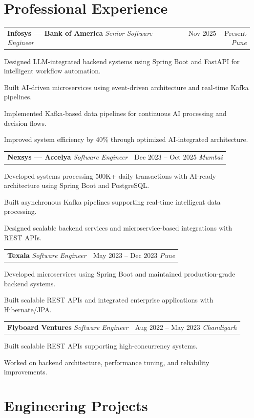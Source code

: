 \documentclass[10pt, letterpaper]{article}
\makeatletter
\newcommand{\resumeitem}[1]{\item\small{#1}}
\newcommand{\jobheading}[4]{%
  \noindent
  \begin{tabularx}{\textwidth}{@{}X r@{}}
    \textbf{\color{primary}#1} \textbar{} \textit{\small\color{subtle}#2} &
    \small\color{subtle}#3 \textbar{} \textit{\small #4}
  \end{tabularx}%
}
\makeatother
\begin{document}
\section{Professional Experience}

\jobheading{Infosys --- Bank of America}{Senior Software Engineer}{Nov 2025 -- Present}{Pune}

\begin{jobitems}
\resumeitem{Designed LLM-integrated backend systems using Spring Boot and FastAPI for intelligent workflow automation.}
\resumeitem{Built AI-driven microservices using event-driven architecture and real-time Kafka pipelines.}
\resumeitem{Implemented Kafka-based data pipelines for continuous AI processing and decision flows.}
\resumeitem{Improved system efficiency by 40\% through optimized AI-integrated architecture.}
\end{jobitems}

\jobheading{Nexsys --- Accelya}{Software Engineer}{Dec 2023 -- Oct 2025}{Mumbai}

\begin{jobitems}
\resumeitem{Developed systems processing 500K+ daily transactions with AI-ready architecture using Spring Boot and PostgreSQL.}
\resumeitem{Built asynchronous Kafka pipelines supporting real-time intelligent data processing.}
\resumeitem{Designed scalable backend services and microservice-based integrations with REST APIs.}
\end{jobitems}

\jobheading{Texala}{Software Engineer}{May 2023 -- Dec 2023}{Pune}

\begin{jobitems}
\resumeitem{Developed microservices using Spring Boot and maintained production-grade backend systems.}
\resumeitem{Built scalable REST APIs and integrated enterprise applications with Hibernate/JPA.}
\end{jobitems}

\jobheading{Flyboard Ventures}{Software Engineer}{Aug 2022 -- May 2023}{Chandigarh}

\begin{jobitems}
\resumeitem{Built scalable REST APIs supporting high-concurrency systems.}
\resumeitem{Worked on backend architecture, performance tuning, and reliability improvements.}
\end{jobitems}

\section{Engineering Projects}
\end{document}
